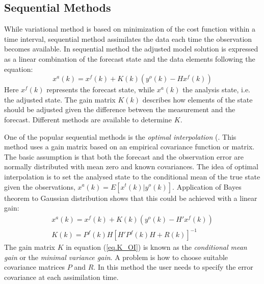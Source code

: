 \subsection{Sequential Methods}
While variational method is based on minimization of the cost function within a
time interval, sequential method assimilates the data each time the observation
becomes available. In sequential method the adjusted model solution is
expressed as a linear combination of the forecast state and the data elements
following the equation:
\begin{equation}
x^a(k) = x^f(k) + K(k)(y^o(k)-Hx^f(k))
\end{equation}
Here $x^f(k)$ represents the forecast state, while $x^a(k)$ the analysis state,
i.e. the adjusted state. The gain matrix $K(k)$ describes how elements of the
state should be adjusted given the difference between the measurement and the
forecast. Different methods are available to determine $K$.

One of the popular sequential methods is the \emph{optimal interpolation} (\cite{Daley1991}. This method uses a gain matrix based on an empirical covariance
function or matrix. The basic assumption is that both the forecast and the
observation error are normally distributed with mean zero and known
covariances. The idea of optimal interpolation is to set the analysed state to
the conditional mean of the true state given the observations,
$x^a(k)=E[x^t(k)|y^o(k)]$. Application of Bayes theorem to Gaussian
distribution shows that this could be achieved with a linear gain:
\begin{eqnarray}
x^a(k)=x^f(k)+K(k)(y^o(k)-H'x^f(k)) \\
K(k)=P^f(k) H [H' P^f(k) H + R(k)]^{-1} \label{eq.K_OI}
\end{eqnarray}
The gain matrix $K$ in equation (\ref{eq.K_OI}) is known as the
\emph{conditional mean gain} or the \emph{minimal variance gain}. A problem is
how to choose suitable covariance matrices $P$ and $R$. In this method the user
needs to specify the error covariance at each assimilation time.


